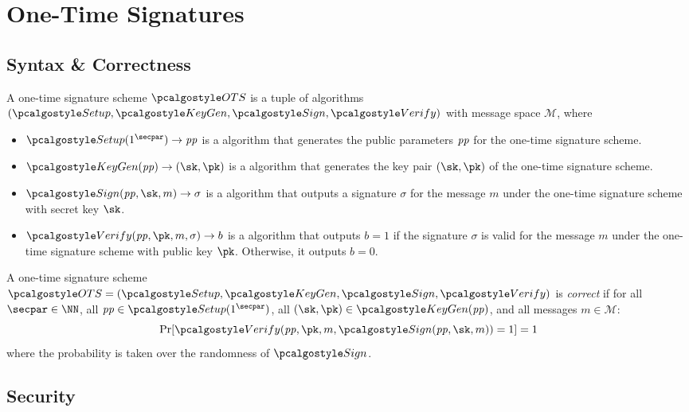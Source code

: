 \section{One-Time Signatures}\label{sec:one-time-sigs}

\subsection{Syntax \& Correctness}

\begin{definition}
    A one-time signature scheme $\algo{OTS}$ is a tuple of \ppt algorithms $(\algo{Setup}, \algo{KeyGen}, \algo{Sign}, \algo{Verify})$ with message space $\mathcal{M}$, where
    \begin{itemize}
        \item $\algo{Setup}(1^\secpar)\rightarrow \params$ is a \ppt algorithm that generates the public parameters $\mathit{pp}$ for the one-time signature scheme.
        \item $\algo{KeyGen}(\params)\rightarrow (\sk, \pk)$ is a \ppt algorithm that generates the key pair $(\sk, \pk)$ of the one-time signature scheme.
        \item $\algo{Sign}(\params, \sk, m) \rightarrow \sigma$ is a \ppt algorithm that outputs a signature $\sigma$ for the message $m$ under the one-time signature scheme with secret key $\sk$.
        \item $\algo{Verify}(\params, \pk, m, \sigma) \rightarrow b$ is a \ppt algorithm that outputs $b = 1$ if the signature $\sigma$ is valid for the message $m$ under the one-time signature scheme with public key $\pk$. Otherwise, it outputs $b = 0$.
    \end{itemize}
\end{definition}

\begin{definition}[Correctness]\label{def:ots-correctness}
  A one-time signature scheme $\algo{OTS} = (\algo{Setup}, \algo{KeyGen}, \algo{Sign}, \algo{Verify})$ is \emph{correct} if for all $\secpar \in \NN$, all $\params \in \algo{Setup}(1^\secpar)$, all $(\sk, \pk) \in \algo{KeyGen}(\params)$, and all messages $m \in \mathcal{M}$:
  \[
    \Pr[\algo{Verify}(\params, \pk, m, \algo{Sign}(\params, \sk, m)) = 1] = 1
  \]
  where the probability is taken over the randomness of $\algo{Sign}$.
\end{definition}

\subsection{Security}

